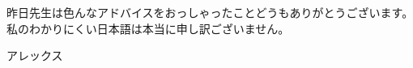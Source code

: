 \documentclass[10pt]{article} %
\begin{document}
\begin{CJK}{UTF8}{min}
昨日先生は色んなアドバイスをおっしゃったことどうもありがとうございます。私のわかりにくい日本語は本当に申し訳ございません。

アレックス
\end{CJK}
\end{document}
